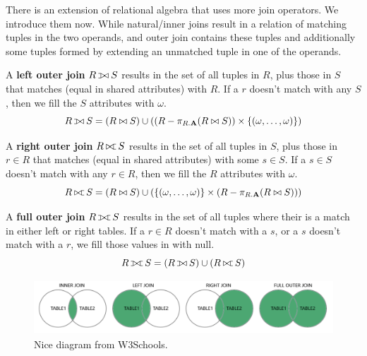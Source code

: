     There is an extension of relational algebra that uses more join operators. We introduce them now. While natural/inner joins result in a relation of matching tuples in the two operands, and outer join contains these tuples and additionally some tuples formed by extending an unmatched tuple in one of the operands. 

    \begin{definition}
      A \textbf{left outer join} $R \lojoin S$ results in the set of all tuples in $R$, plus those in $S$ that matches (equal in shared attributes) with $R$. If a $r$ doesn't match with any $S$, then we fill the $S$ attributes with $\omega$. 
      \begin{equation}
        R \lojoin S = (R \bowtie S) \cup ( (R - \pi_{R.\mathbf{A}} (R \bowtie S)) \times \{(\omega, \ldots, \omega)\})
      \end{equation}
    \end{definition} 

    \begin{definition}
      A \textbf{right outer join} $R \rojoin S$ results in the set of all tuples in $S$, plus those in $r \in R$ that matches (equal in shared attributes) with some $s \in S$. If a $s \in S$ doesn't match with any $r \in R$, then we fill the $R$ attributes with $\omega$. 
      \begin{equation}
        R \rojoin S = (R \bowtie S) \cup ( \{(\omega, \ldots, \omega)\} \times (R - \pi_{R.\mathbf{A}} (R \bowtie S)))
      \end{equation}
    \end{definition}

    \begin{definition}
      A \textbf{full outer join} $R \fojoin S$ results in the set of all tuples where their is a match in either left or right tables. If a $r \in R$ doesn't match with a $s$, or a $s$ doesn't match with a $r$, we fill those values in with null. 
      \begin{equation}
        R \fojoin S = (R \lojoin S) \cup (R \rojoin S)
      \end{equation}
    \end{definition}

    \begin{figure}[H]
      \centering 
      \includegraphics[scale=0.4]{img/outerjoin.png}
      \caption{Nice diagram from W3Schools.} 
      \label{fig:outerjoin}
    \end{figure} 

